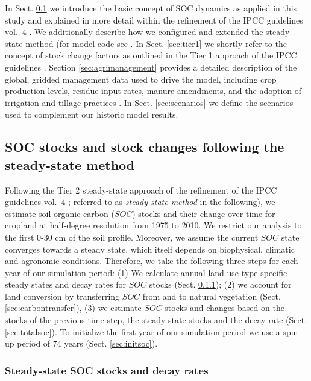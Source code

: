 \documentclass[gc, manuscript]{copernicus}
\begin{document}
In Sect. \ref{sec:carbonbudget} we introduce the basic concept of SOC dynamics as applied in this study and explained in more detail within the refinement of the IPCC guidelines vol.~4 \citep{calvo_buendia_ipcc_2019}. We additionally describe how we configured and extended the steady-state method (for model code see \citep{karstens_mrsoil_2020}. In Sect. \ref{sec:tier1} we shortly refer to the concept of stock change factors as outlined in the Tier 1 approach of the IPCC guidelines \citep{eggleston_ipcc_2006, calvo_buendia_ipcc_2019}.
Section \ref{sec:agrimanagement} provides a detailed description of the global, gridded management data used to drive the model, including crop production levels, residue input rates, manure amendments, and the adoption of irrigation and tillage practices \citep[for model code see][]{bodirsky_mrcommons_2020}. In Sect. \ref{sec:scenarios} we define the scenarios used to complement our historic model results.

\hypertarget{sec:carbonbudget}{%
\subsection{SOC stocks and stock changes following the steady-state method}\label{sec:carbonbudget}}

Following the Tier 2 steady-state approach of the refinement of the IPCC guidelines vol.~4 \citep{calvo_buendia_ipcc_2019}; referred to as \textit{steady-state method} in the following), we estimate soil organic carbon (\(SOC\)) stocks and their change over time for cropland at half-degree resolution from 1975 to 2010. We restrict our analysis to the first 0-30 cm of the soil profile. Moreover, we assume the current \(SOC\) state converges towards a steady state, which itself depends on biophysical, climatic and agronomic conditions.
Therefore, we take the following three steps for each year of our simulation period:
(1) We calculate annual land-use type-specific steady states and decay rates for \(SOC\) stocks (Sect. \ref{sec:steadystates});
(2) we account for land conversion by transferring \(SOC\) from and to natural vegetation (Sect. \ref{sec:carbontransfer}),
(3) we estimate \(SOC\) stocks and changes based on the stocks of the previous time step, the steady state stocks and the decay rate (Sect. \ref{sec:totalsoc}).
To initialize the first year of our simulation period we use a spin-up period of 74 years (Sect. \ref{sec:initsoc}).

\hypertarget{sec:steadystates}{%
\subsubsection{Steady-state SOC stocks and decay rates}\label{sec:steadystates}}
\end{document}
